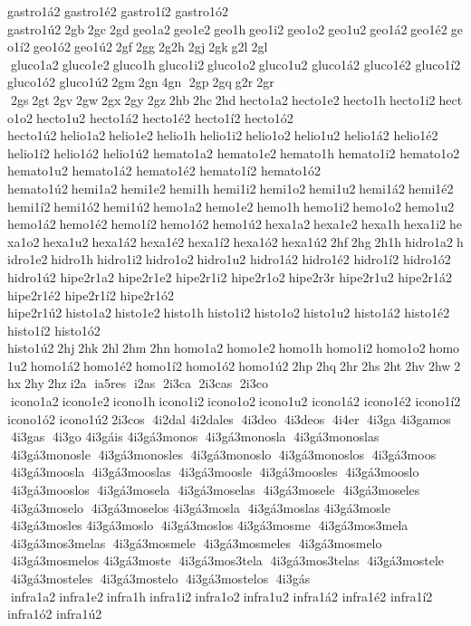 gastro1á2 
gastro1é2 
gastro1í2 
gastro1ó2 
gastro1ú2 2gb 2gc 2gd geo1a2 geo1e2 geo1h geo1i2 geo1o2 geo1u2 geo1á2 geo1é2 geo1í2 geo1ó2 geo1ú2 2gf 2gg 2g2h 2gj 2gk g2l 2gl  gluco1a2 gluco1e2 gluco1h gluco1i2 gluco1o2 gluco1u2 	gluco1á2 	gluco1é2 	gluco1í2 	gluco1ó2 	gluco1ú2 2gm 2gn 4gn  2gp 2gq g2r 2gr  2gs 2gt 2gv 2gw 2gx 2gy 2gz 2hb 2hc 2hd hecto1a2 hecto1e2 hecto1h hecto1i2 hecto1o2 hecto1u2 	hecto1á2 	hecto1é2 	hecto1í2 	hecto1ó2 	hecto1ú2 helio1a2 helio1e2 helio1h helio1i2 helio1o2 helio1u2 	helio1á2 	helio1é2 	helio1í2 	helio1ó2 	helio1ú2 	hemato1a2 	hemato1e2 hemato1h 	hemato1i2 	hemato1o2 	hemato1u2 
hemato1á2 
hemato1é2 
hemato1í2 
hemato1ó2 
hemato1ú2 hemi1a2 hemi1e2 hemi1h hemi1i2 hemi1o2 hemi1u2 hemi1á2 hemi1é2 hemi1í2 hemi1ó2 hemi1ú2 hemo1a2 hemo1e2 hemo1h hemo1i2 hemo1o2 hemo1u2 hemo1á2 hemo1é2 hemo1í2 hemo1ó2 hemo1ú2 hexa1a2 hexa1e2 hexa1h hexa1i2 hexa1o2 hexa1u2 hexa1á2 hexa1é2 hexa1í2 hexa1ó2 hexa1ú2 2hf 2hg 2h1h hidro1a2 hidro1e2 hidro1h hidro1i2 hidro1o2 hidro1u2 	hidro1á2 	hidro1é2 	hidro1í2 	hidro1ó2 	hidro1ú2 	hipe2r1a2 	hipe2r1e2 	hipe2r1i2 	hipe2r1o2 hipe2r3r 	hipe2r1u2 
hipe2r1á2 
hipe2r1é2 
hipe2r1í2 
hipe2r1ó2 
hipe2r1ú2 histo1a2 histo1e2 histo1h histo1i2 histo1o2 histo1u2 	histo1á2 	histo1é2 	histo1í2 	histo1ó2 	histo1ú2 2hj 2hk 2hl 2hm 2hn homo1a2 homo1e2 homo1h homo1i2 homo1o2 homo1u2 homo1á2 homo1é2 homo1í2 homo1ó2 homo1ú2 2hp 2hq 2hr 2hs 2ht 2hv 2hw 2hx 2hy 2hz i2a  ia5res  i2as  2i3ca  2i3cas  2i3co  icono1a2 icono1e2 icono1h icono1i2 icono1o2 icono1u2 	icono1á2 	icono1é2 	icono1í2 	icono1ó2 	icono1ú2 2i3cos  4i2dal  	4i2dales  4i3deo  4i3deos  4i4er  4i3ga  	4i3gamos  4i3gas  4i3go  	4i3gáis  
4i3gá3monos  4i3gá3monosla  4i3gá3monoslas  4i3gá3monosle  4i3gá3monosles  4i3gá3monoslo  4i3gá3monoslos  4i3gá3moos  4i3gá3moosla  4i3gá3mooslas  4i3gá3moosle  4i3gá3moosles  4i3gá3mooslo  4i3gá3mooslos  4i3gá3mosela  4i3gá3moselas  4i3gá3mosele  4i3gá3moseles  4i3gá3moselo  4i3gá3moselos  
4i3gá3mosla  4i3gá3moslas  
4i3gá3mosle  4i3gá3mosles  
4i3gá3moslo  4i3gá3moslos  
4i3gá3mosme  4i3gá3mos3mela  4i3gá3mos3melas  4i3gá3mosmele  4i3gá3mosmeles  4i3gá3mosmelo  4i3gá3mosmelos  
4i3gá3moste  4i3gá3mos3tela  4i3gá3mos3telas  4i3gá3mostele  4i3gá3mosteles  4i3gá3mostelo  4i3gá3mostelos  4i3gás  infra1a2 infra1e2 infra1h infra1i2 infra1o2 infra1u2 	infra1á2 	infra1é2 	infra1í2 	infra1ó2 	infra1ú2 
